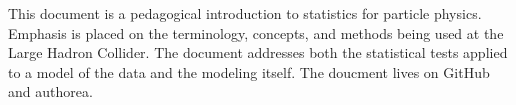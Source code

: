 This document is a pedagogical introduction to statistics for particle physics.  
Emphasis is placed on the terminology, concepts, and methods being used at the Large Hadron Collider.  
The document addresses both the statistical tests applied to a model of the data and the modeling itself.
The doucment lives on GitHub and authorea.